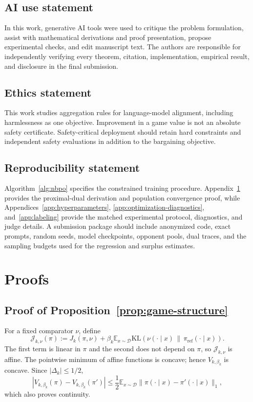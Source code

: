 \documentclass{article}
\theoremstyle{remark}
\theoremstyle{plain}
\newcommand{\KL}{\mathrm{KL}}
\newcommand{\E}{\mathbb{E}}
\newcommand{\D}{\mathcal{D}}
\newcommand{\piref}{\pi_{\mathrm{ref}}}
\begin{document}
\subsection*{AI use statement}
In this work, generative AI tools were used to critique the problem formulation, assist with mathematical derivations and proof presentation, propose experimental checks, and edit manuscript text. The authors are responsible for independently verifying every theorem, citation, implementation, empirical result, and disclosure in the final submission.

\subsection*{Ethics statement}
This work studies aggregation rules for language-model alignment, including harmlessness as one objective. Improvement in a game value is not an absolute safety certificate. Safety-critical deployment should retain hard constraints and independent safety evaluations in addition to the bargaining objective.

\subsection*{Reproducibility statement}
Algorithm~\ref{alg:nbpo} specifies the constrained training procedure. Appendix~\ref{app:proofs} provides the proximal-dual derivation and population convergence proof, while Appendices~\ref{app:hyperparameters}, \ref{app:optimization-diagnostics}, and~\ref{app:labeling} provide the matched experimental protocol, diagnostics, and judge details. A submission package should include anonymized code, exact prompts, random seeds, model checkpoints, opponent pools, dual traces, and the sampling budgets used for the regression and surplus estimates.




\appendix

\section{Proofs}
\label{app:proofs}

\subsection{Proof of Proposition~\ref{prop:game-structure}}
\label{app:proof-game-structure}
For a fixed comparator $\nu$, define
\[
\mathcal J_{k,\nu}(\pi)
:=
J_k(\pi,\nu)
+
\beta_k\E_{x\sim\D}
\KL\!\left(\nu(\cdot\mid x)\,\|\,\piref(\cdot\mid x)\right).
\]
The first term is linear in $\pi$ and the second does not depend on $\pi$, so $\mathcal J_{k,\nu}$ is affine. The pointwise minimum of affine functions is concave; hence $V_{k,\beta_k}$ is concave. Since $|\Delta_k|\le1/2$,
\[
|V_{k,\beta_k}(\pi)-V_{k,\beta_k}(\pi')|
\le
\frac12\E_{x\sim\D}
\|\pi(\cdot\mid x)-\pi'(\cdot\mid x)\|_1,
\]
which also proves continuity.
\end{document}
